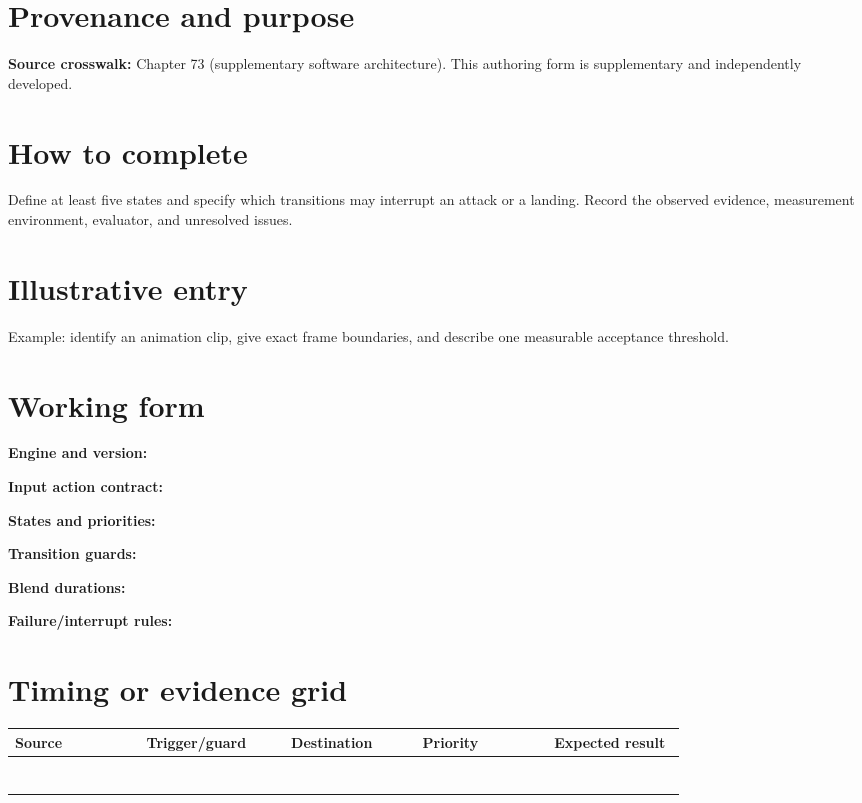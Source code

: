 \documentclass[10pt,letterpaper]{article}
\begin{document}
\makedoctitle
\makedocsummary

\section{Provenance and purpose}
\textbf{Source crosswalk:} Chapter 73 (supplementary software architecture). This authoring form is supplementary and independently developed.
\section{How to complete}
Define at least five states and specify which transitions may interrupt an attack or a landing. Record the observed evidence, measurement environment, evaluator, and unresolved issues. 
\section{Illustrative entry}
Example: identify an animation clip, give exact frame boundaries, and describe one measurable acceptance threshold.
\section{Working form}
\noindent\textbf{Engine and version:}\quad\hrulefill\par\vspace{10pt}
\noindent\textbf{Input action contract:}\quad\hrulefill\par\vspace{10pt}
\noindent\textbf{States and priorities:}\quad\hrulefill\par\vspace{10pt}
\noindent\textbf{Transition guards:}\quad\hrulefill\par\vspace{10pt}
\noindent\textbf{Blend durations:}\quad\hrulefill\par\vspace{10pt}
\noindent\textbf{Failure/interrupt rules:}\quad\hrulefill\par\vspace{10pt}\section{Timing or evidence grid}
\begin{longtable}{|p{0.156\linewidth}|p{0.156\linewidth}|p{0.156\linewidth}|p{0.156\linewidth}|p{0.156\linewidth}|}
\hline
\textbf{Source} & \textbf{Trigger/guard} & \textbf{Destination} & \textbf{Priority} & \textbf{Expected result}\\\hline
\endhead
\rule{0pt}{20pt} &  &  &  & \\\hline
\rule{0pt}{20pt} &  &  &  & \\\hline
\rule{0pt}{20pt} &  &  &  & \\\hline
\rule{0pt}{20pt} &  &  &  & \\\hline
\rule{0pt}{20pt} &  &  &  & \\\hline
\rule{0pt}{20pt} &  &  &  & \\\hline
\rule{0pt}{20pt} &  &  &  & \\\hline
\end{longtable}
\end{document}

